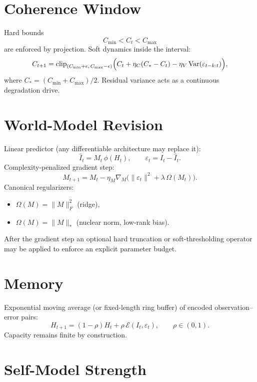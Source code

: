 \documentclass[11pt,a4paper]{article}
\begin{document}
\section{Coherence Window}

Hard bounds
\[
C_{\min}<C_t<C_{\max}
\]
are enforced by projection. Soft dynamics inside the interval:
\begin{equation}
C_{t+1}=\operatorname{clip}_{(C_{\min}+\epsilon,\,C_{\max}-\epsilon)}\Bigl(
C_t+\eta_C(C_*-C_t)-\eta_V\operatorname{Var}(\varepsilon_{t-k:t})
\Bigr),
\end{equation}
where \(C_*=(C_{\min}+C_{\max})/2\). Residual variance acts as a continuous degradation drive.

\section{World-Model Revision}

Linear predictor (any differentiable architecture may replace it):
\[
\widehat{I}_t=M_t\,\phi(H_t),\qquad\varepsilon_t=I_t-\widehat{I}_t.
\]
Complexity-penalized gradient step:
\begin{equation}
M_{t+1}=M_t-\eta_M\nabla_M\bigl(\|\varepsilon_t\|^2+\lambda\,\Omega(M_t)\bigr).
\end{equation}
Canonical regularizers:
\begin{itemize}[leftmargin=*]
\item \(\Omega(M)=\|M\|_F^2\) (ridge),
\item \(\Omega(M)=\|M\|_*\) (nuclear norm, low-rank bias).
\end{itemize}
After the gradient step an optional hard truncation or soft-thresholding operator may be applied to enforce an explicit parameter budget.

\section{Memory}

Exponential moving average (or fixed-length ring buffer) of encoded observation--error pairs:
\begin{equation}
H_{t+1}=(1-\rho)H_t+\rho\,\mathcal{E}(I_t,\varepsilon_t),\qquad\rho\in(0,1).
\end{equation}
Capacity remains finite by construction.

\section{Self-Model Strength}
\end{document}
